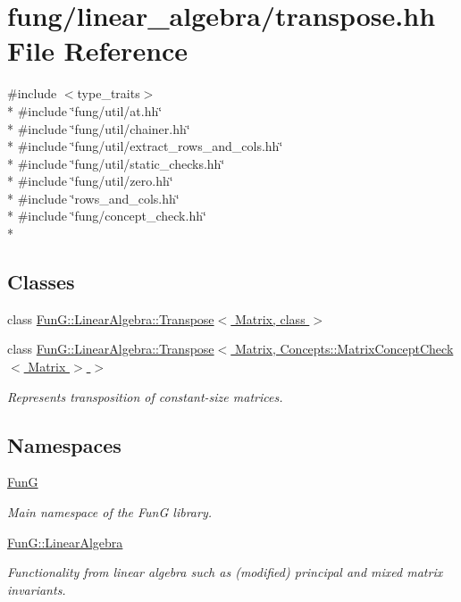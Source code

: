 \hypertarget{transpose_8hh}{}\section{fung/linear\+\_\+algebra/transpose.hh File Reference}
\label{transpose_8hh}
{\ttfamily \#include $<$type\+\_\+traits$>$}\\*
{\ttfamily \#include \char`\"{}fung/util/at.\+hh\char`\"{}}\\*
{\ttfamily \#include \char`\"{}fung/util/chainer.\+hh\char`\"{}}\\*
{\ttfamily \#include \char`\"{}fung/util/extract\+\_\+rows\+\_\+and\+\_\+cols.\+hh\char`\"{}}\\*
{\ttfamily \#include \char`\"{}fung/util/static\+\_\+checks.\+hh\char`\"{}}\\*
{\ttfamily \#include \char`\"{}fung/util/zero.\+hh\char`\"{}}\\*
{\ttfamily \#include \char`\"{}rows\+\_\+and\+\_\+cols.\+hh\char`\"{}}\\*
{\ttfamily \#include \char`\"{}fung/concept\+\_\+check.\+hh\char`\"{}}\\*
\subsection*{Classes}
\begin{DoxyCompactItemize}
\item 
class \hyperlink{classFunG_1_1LinearAlgebra_1_1Transpose}{Fun\+G\+::\+Linear\+Algebra\+::\+Transpose$<$ Matrix, class $>$}
\item 
class \hyperlink{classFunG_1_1LinearAlgebra_1_1Transpose_3_01Matrix_00_01Concepts_1_1MatrixConceptCheck_3_01Matrix_01_4_01_4}{Fun\+G\+::\+Linear\+Algebra\+::\+Transpose$<$ Matrix, Concepts\+::\+Matrix\+Concept\+Check$<$ Matrix $>$ $>$}
\begin{DoxyCompactList}\small\item\em Represents transposition of constant-\/size matrices. \end{DoxyCompactList}\end{DoxyCompactItemize}
\subsection*{Namespaces}
\begin{DoxyCompactItemize}
\item 
 \hyperlink{namespaceFunG}{FunG}
\begin{DoxyCompactList}\small\item\em Main namespace of the FunG library. \end{DoxyCompactList}\item 
 \hyperlink{namespaceFunG_1_1LinearAlgebra}{Fun\+G\+::\+Linear\+Algebra}
\begin{DoxyCompactList}\small\item\em Functionality from linear algebra such as (modified) principal and mixed matrix invariants. \end{DoxyCompactList}\end{DoxyCompactItemize}
